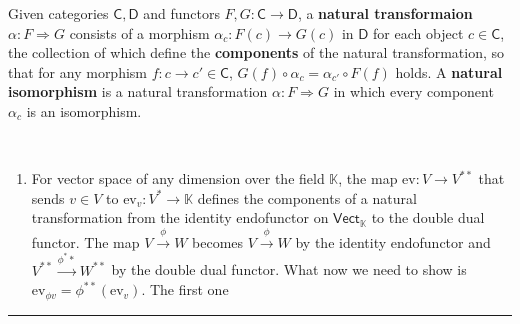 \begin{defn} Given categories $\mathsf{C},\mathsf{D}$ and functors $F,G:\mathsf{C}\rightarrow \mathsf{D}$, a \textbf{natural transformaion} $\alpha:F\Rightarrow G$ consists of a morphism $\alpha_c:F(c)\rightarrow G(c)$ in $\mathsf{D}$ for each object $c\in\mathsf{C}$, the collection of which define the \textbf{components} of the natural transformation, so  that for any morphism $f:c\rightarrow c'\in\mathsf{C}$, $G(f)\circ \alpha_c=\alpha_{c'}\circ F(f)$ holds. A \textbf{natural isomorphism} is a natural transformation $\alpha:F\Rightarrow G$ in which every component $\alpha_c$ is an isomorphism.
\end{defn}

\begin{exmp}
~\begin{enumerate}
\item For vector space of any dimension over the field $\mathbb{K}$, the map $\mathrm{ev}:V\rightarrow V^{**}$ that sends $v\in V$ to $\mathrm{ev}_v:V^*\rightarrow \mathbb{K}$ defines the components of a natural transformation from the identity endofunctor on $\mathsf{Vect}_{\mathbb{K}}$ to the double dual functor. The map $V\xrightarrow{\phi}W$ becomes $V\xrightarrow{\phi}W$ by the identity endofunctor and $V^{**}\xrightarrow{\phi^**}W^{**}$ by the double dual functor. What now we need to show is $\mathrm{ev}_{\phi v}=\phi^{**}(\mathrm{ev}_v)$. The first one 
\end{enumerate}
\end{exmp}

\noindent\rule{\textwidth}{1pt}
\newline